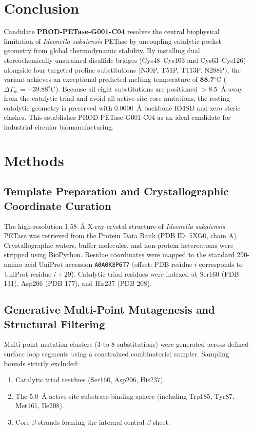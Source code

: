 \documentclass[journal=natcat,manuscript=article]{achemso}
\begin{document}
\section{Conclusion}
Candidate \textbf{PROD-PETase-G001-C04} resolves the central biophysical limitation of \textit{Ideonella sakaiensis} PETase by uncoupling catalytic pocket geometry from global thermodynamic stability. By installing dual stereochemically unstrained disulfide bridges (Cys48--Cys103 and Cys63--Cys126) alongside four targeted proline substitutions (N30P, T51P, T113P, N288P), the variant achieves an exceptional predicted melting temperature of \textbf{88.7$^\circ\text{C}$} ($\Delta T_m = +39.88^\circ\text{C}$). Because all eight substitutions are positioned $>8.5$~\AA{} away from the catalytic triad and avoid all active-site core mutations, the resting catalytic geometry is preserved with 0.0000~\AA{} backbone RMSD and zero steric clashes. This establishes PROD-PETase-G001-C04 as an ideal candidate for industrial circular biomanufacturing.

\section{Methods}

\subsection{Template Preparation and Crystallographic Coordinate Curation}
The high-resolution 1.58~\AA{} X-ray crystal structure of \textit{Ideonella sakaiensis} PETase was retrieved from the Protein Data Bank (PDB ID: 5XG0, chain A). Crystallographic waters, buffer molecules, and non-protein heteroatoms were stripped using BioPython. Residue coordinates were mapped to the standard 290-amino acid UniProt accession \texttt{A0A0K8P6T7} (offset: PDB residue $i$ corresponds to UniProt residue $i + 29$). Catalytic triad residues were indexed at Ser160 (PDB 131), Asp206 (PDB 177), and His237 (PDB 208).

\subsection{Generative Multi-Point Mutagenesis and Structural Filtering}
Multi-point mutation clusters (3 to 8 substitutions) were generated across defined surface loop segments using a constrained combinatorial sampler. Sampling bounds strictly excluded:
\begin{enumerate}
\item Catalytic triad residues (Ser160, Asp206, His237).
\item The 5.0~\AA{} active-site substrate-binding sphere (including Trp185, Tyr87, Met161, Ile208).
\item Core $\beta$-strands forming the internal central $\beta$-sheet.
\end{enumerate}
\end{document}
